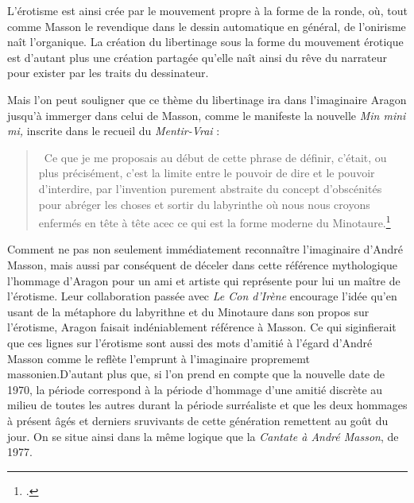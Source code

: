 	 L'érotisme est ainsi crée par le mouvement propre à la forme de la ronde, où, tout comme Masson le revendique dans le dessin automatique en général, de l'onirisme naît l'organique. La création du libertinage sous la forme du mouvement érotique est d'autant plus une création partagée qu'elle naît ainsi du rêve du narrateur pour exister par les traits du dessinateur. 

	 Mais l'on peut souligner que ce thème du libertinage ira dans l'imaginaire Aragon jusqu'à immerger dans celui de Masson, comme le manifeste la nouvelle \emph{Min mini mi,} inscrite dans le recueil du \emph{Mentir-Vrai} :

	 \begin{quote}
	 Ce que je me proposais au début de cette phrase de définir, c’était, ou plus précisément, c’est la limite entre le pouvoir de dire et le pouvoir d’interdire, par l’invention purement abstraite du concept d’obscénités pour abréger les choses et sortir du labyrinthe où nous nous croyons enfermés en tête à tête acec ce qui est la forme moderne du Minotaure.\footcite[p494]{mentirvrai}\end{quote}

	 Comment ne pas non seulement immédiatement reconnaître l'imaginaire d'André Masson, mais aussi par conséquent de déceler dans cette référence mythologique l'hommage d'Aragon pour un ami et artiste qui représente pour lui un maître de l'érotisme. Leur collaboration passée avec \emph{Le Con d'Irène} encourage l'idée qu'en usant de la métaphore du labyrithne et du Minotaure dans son propos sur l'érotisme, Aragon faisait indéniablement référence à Masson. Ce qui siginfierait que ces lignes sur l'érotisme sont aussi des mots d'amitié à l'égard d'André Masson comme le reflète l'emprunt à l'imaginaire proprememt massonien.D'autant plus que, si l'on prend en compte que la nouvelle date de 1970, la période correspond à la période d'hommage d'une amitié discrète au milieu de toutes les autres durant la période surréaliste et que les deux hommages à présent âgés et derniers sruvivants de cette génération remettent au goût du jour. On se situe ainsi dans la même logique que la \emph{Cantate à André Masson}, de 1977. 
	 
